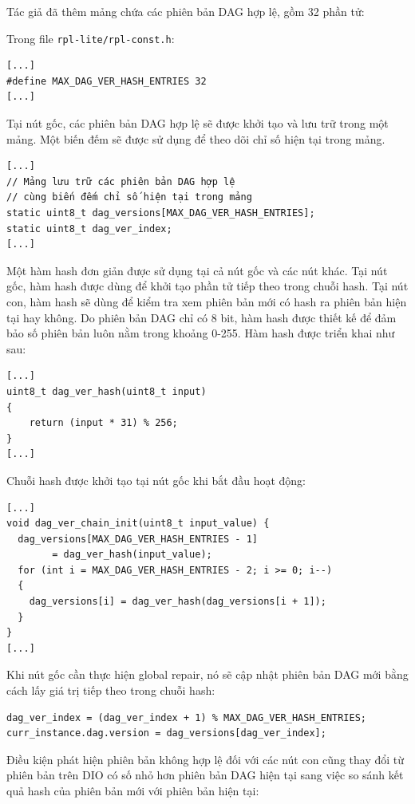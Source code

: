 Tác giả đã thêm mảng chứa các phiên bản DAG hợp lệ, gồm 32 phần tử:

Trong file \texttt{rpl-lite/rpl-const.h}:
\begin{verbatim}
[...]
#define MAX_DAG_VER_HASH_ENTRIES 32
[...]
\end{verbatim}

Tại nút gốc, các phiên bản DAG hợp lệ sẽ được khởi tạo và lưu trữ trong một mảng. Một biến đếm sẽ được sử dụng để theo dõi chỉ số hiện tại trong mảng.

\begin{verbatim}
[...]
// Mảng lưu trữ các phiên bản DAG hợp lệ
// cùng biến đếm chỉ số hiện tại trong mảng
static uint8_t dag_versions[MAX_DAG_VER_HASH_ENTRIES];
static uint8_t dag_ver_index;
[...]
\end{verbatim}

Một hàm hash đơn giản được sử dụng tại cả nút gốc và các nút khác. Tại nút gốc, hàm hash được dùng để khởi tạo phần tử tiếp theo trong chuỗi hash. Tại nút con, hàm hash sẽ dùng để kiểm tra xem phiên bản mới có hash ra phiên bản hiện tại hay không. Do phiên bản DAG chỉ có 8 bit, hàm hash được thiết kế để đảm bảo số phiên bản luôn nằm trong khoảng 0-255. Hàm hash được triển khai như sau:

\begin{verbatim}
[...]
uint8_t dag_ver_hash(uint8_t input)
{
    return (input * 31) % 256;
}
[...]
\end{verbatim}

Chuỗi hash được khởi tạo tại nút gốc khi bắt đầu hoạt động:
\begin{verbatim}
[...]
void dag_ver_chain_init(uint8_t input_value) {
  dag_versions[MAX_DAG_VER_HASH_ENTRIES - 1] 
        = dag_ver_hash(input_value);
  for (int i = MAX_DAG_VER_HASH_ENTRIES - 2; i >= 0; i--)
  {
    dag_versions[i] = dag_ver_hash(dag_versions[i + 1]);
  }
}
[...]
\end{verbatim}

Khi nút gốc cần thực hiện global repair, nó sẽ cập nhật phiên bản DAG mới bằng cách lấy giá trị tiếp theo trong chuỗi hash:

\begin{verbatim}
dag_ver_index = (dag_ver_index + 1) % MAX_DAG_VER_HASH_ENTRIES;
curr_instance.dag.version = dag_versions[dag_ver_index];
\end{verbatim}

Điều kiện phát hiện phiên bản không hợp lệ đối với các nút con cũng thay đổi từ phiên bản trên DIO có số nhỏ hơn phiên bản DAG hiện tại sang việc so sánh kết quả hash của phiên bản mới với phiên bản hiện tại:

